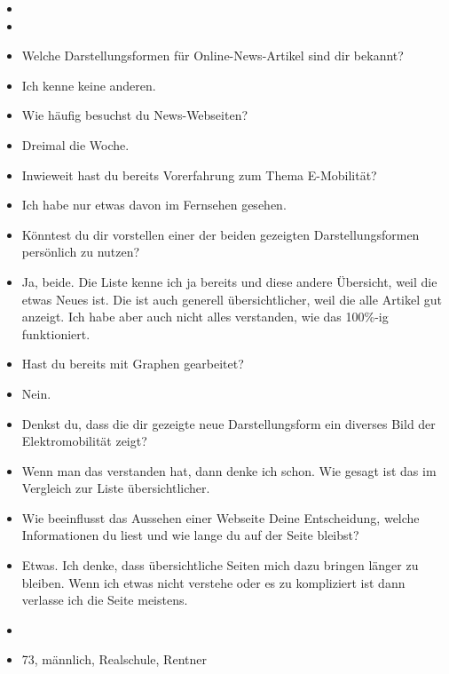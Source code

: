 {\begin{itemize}[]
            \item {}
            \item {}
            \item {} Welche Darstellungsformen für Online-News-Artikel sind dir bekannt?
            \item {} Ich kenne keine anderen.
            \item {} Wie häufig besuchst du News-Webseiten?
            \item {} Dreimal die Woche.
            \item {} Inwieweit hast du bereits Vorerfahrung zum Thema E-Mobilität?
            \item {} Ich habe nur etwas davon im Fernsehen gesehen.
            \item {} Könntest du dir vorstellen einer der beiden gezeigten Darstellungsformen persönlich zu nutzen?
            \item {} Ja, beide. Die Liste kenne ich ja bereits und diese andere Übersicht, weil die etwas Neues ist.
                  Die ist auch generell übersichtlicher, weil die alle Artikel gut anzeigt.
                  Ich habe aber auch nicht alles verstanden, wie das 100\%-ig funktioniert.
            \item {} Hast du bereits mit Graphen gearbeitet?
            \item {} Nein.
            \item {} Denkst du, dass die dir gezeigte neue Darstellungsform ein diverses Bild der Elektromobilität zeigt?
            \item {} Wenn man das verstanden hat, dann denke ich schon.
                  Wie gesagt ist das im Vergleich zur Liste übersichtlicher.
            \item {} Wie beeinflusst das Aussehen einer Webseite Deine Entscheidung, welche Informationen du liest und wie lange du auf der Seite bleibst?
            \item {} Etwas. Ich denke, dass übersichtliche Seiten mich dazu bringen länger zu bleiben.
                  Wenn ich etwas nicht verstehe oder es zu kompliziert ist dann verlasse ich die Seite meistens.
            \item {}
            \item {} 73, männlich, Realschule, Rentner
      \end{itemize}}
\nolinenumbers
